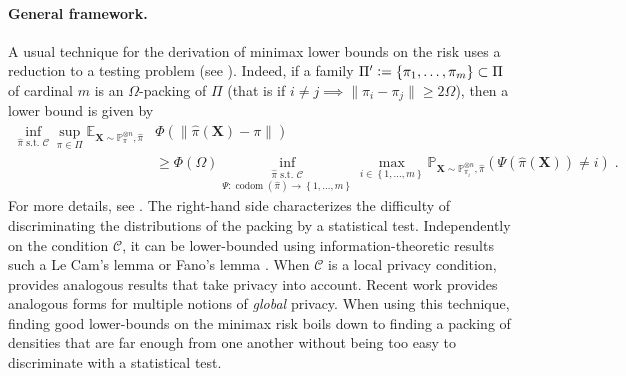 \documentclass[10pt]{article} %
\newcommand{\Prob}[0]{\mathbb{P}}
\newcommand{\E}[0]{\mathbb{E}}
\newcommand{\eqdef}{\vcentcolon=}
\newcommand\mech[1]{\mathfrak{#1}}
\newcommand\vect[1]{\mathbf{#1}}
\newcommand\codom[1]{\operatorname{codom}\left({#1}\right)}
\newcommand\intslice[2]{\left\{ {#1}, \dots,  {#2} \right\}}
\newcommand\p[1]{\left( {#1}\right)}
\newcommand\RG[1]{\textcolor{red}{#1}}
\newcommand\mRG[1]{\marginpar{\tiny\RG{#1}}}
\newcommand\CL[1]{\textcolor{blue}{#1}}
\begin{document}
\paragraph{General framework.}
A usual technique for the derivation of minimax lower bounds on the risk uses a reduction to a testing problem (see \citet{tsybakov2003introduction}). Indeed, if a family $\Pi' \eqdef \{ \pi_1, \dots, \pi_m\} \subset \Pi$ of cardinal $m$ is an $\Omega$-packing of %
$\Pi$ (that is
if $i \neq j \implies \|\pi_i - \pi_j \| \geq 2 \Omega$), then
a lower bound is given by %
\begin{equation}
\label{jkhgqskdjhfbgkjqhwgsdkfjhgkqwsjhdgfjkhwsgdb}
\begin{aligned}
    \inf_{\hat{\pi} \text{ s.t. } \mathcal{C}} \sup_{\pi \in \Pi}  \E_{\vect{X} \sim \Prob_{\pi}^{\otimes n}, \hat{\pi}} &\Phi(\|\hat{\pi}(\vect{X}) - \pi \|) \\
    &\geq 
    \Phi(\Omega) \underset{\Psi : \codom{\hat{\pi}} \rightarrow\intslice{1}{m}}{\inf_{\hat{\pi} \text{ s.t. } \mathcal{C}}}  \max_{i \in \intslice{1}{m}} \Prob_{\mathbf{X} \sim \Prob_{\pi_i}^{\otimes n},\hat{\pi}} \p{ \Psi \p{\hat{\pi}(\vect{X})} \neq i}\;.
\end{aligned}
\end{equation}
For more details, see \citet{duchi2018minimax,acharya2021differentially,lalanne2022statistical}. The right-hand side characterizes the difficulty of discriminating the distributions of the packing by a statistical test. Independently on the condition $\mathcal{C}$, it can be lower-bounded using information-theoretic results such a Le Cam's lemma \citep[Lemma 5.3]{rigollet2015high} or Fano's lemma \citep[Theorem 3.1]{giraud2021introduction}. When $\mathcal{C}$ is a local privacy condition, \citet{duchi2018minimax} provides analogous results that take privacy into account. Recent work \citep{acharya2021differentially,kamath2022improved,lalanne2022statistical} provides analogous forms for multiple notions of \emph{global} privacy. When using this technique, finding good lower-bounds on the minimax risk boils down to finding a packing of densities that are far enough from one another without being too easy to discriminate with a statistical test.
\end{document}
